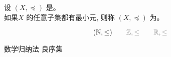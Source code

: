 
\begin{frame}{}
  \begin{definition}
    设 $(X, \preceq)$ 是。 \\[5pt]
    如果$X$ 的任意子集都有最小元, 则称 $(X, \preceq)$ 为。
  \end{definition}

  \pause
  \[
    (\N, \le) \qquad \gray{\Z, \le} \qquad \gray{\R, \le}
  \]

  \pause
  \vspace{0.50cm}
  \begin{center}
    数学归纳法 \qquad 良序集
  \end{center}
\end{frame}
